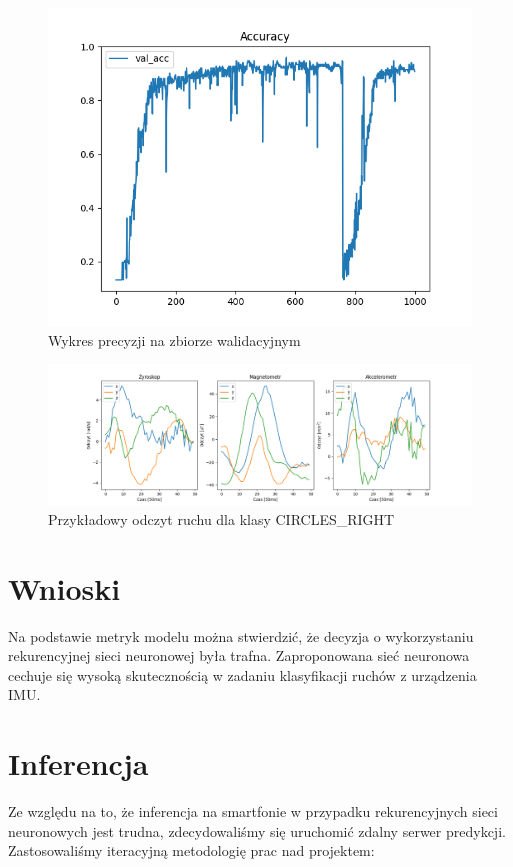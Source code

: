 \documentclass[10pt]{article}
\begin{document}
\begin{figure}
  \includegraphics[width=13cm]{acc.png}
  \centering
  \caption{Wykres precyzji na zbiorze walidacyjnym}
\end{figure}

\begin{figure}
  \includegraphics[width=16cm]{sample.png}
  \centering
  \caption{Przykładowy odczyt ruchu dla klasy CIRCLES\_RIGHT}
\end{figure}

\section{Wnioski}

Na podstawie metryk modelu można stwierdzić, że decyzja o wykorzystaniu rekurencyjnej sieci neuronowej była trafna. Zaproponowana sieć neuronowa cechuje się wysoką skutecznością w zadaniu klasyfikacji ruchów z urządzenia IMU.

\section{Inferencja}

Ze względu na to, że inferencja na smartfonie w przypadku rekurencyjnych sieci neuronowych jest trudna, zdecydowaliśmy się uruchomić zdalny serwer predykcji. Zastosowaliśmy iteracyjną metodologię prac nad projektem: 
\end{document}
